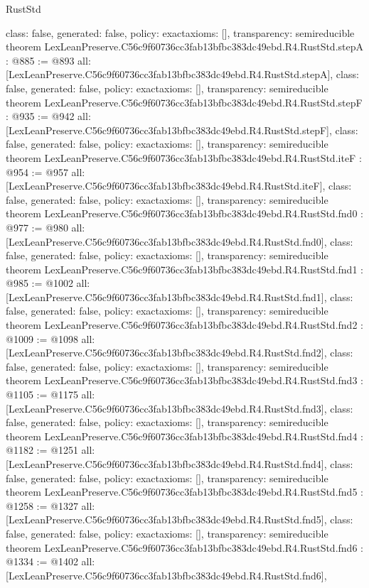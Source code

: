 \begin{lexlean}{RustStd}
\begin{coremodule}
{  class: false,
  generated: false,
  policy: exact{axioms: []},
  transparency: semireducible
}
theorem LexLeanPreserve.C56c9f60736cc3fab13bfbc383dc49ebd.R4.RustStd.stepA : @885 := @893 {
  all: [LexLeanPreserve.C56c9f60736cc3fab13bfbc383dc49ebd.R4.RustStd.stepA],
  class: false,
  generated: false,
  policy: exact{axioms: []},
  transparency: semireducible
}
theorem LexLeanPreserve.C56c9f60736cc3fab13bfbc383dc49ebd.R4.RustStd.stepF : @935 := @942 {
  all: [LexLeanPreserve.C56c9f60736cc3fab13bfbc383dc49ebd.R4.RustStd.stepF],
  class: false,
  generated: false,
  policy: exact{axioms: []},
  transparency: semireducible
}
theorem LexLeanPreserve.C56c9f60736cc3fab13bfbc383dc49ebd.R4.RustStd.iteF : @954 := @957 {
  all: [LexLeanPreserve.C56c9f60736cc3fab13bfbc383dc49ebd.R4.RustStd.iteF],
  class: false,
  generated: false,
  policy: exact{axioms: []},
  transparency: semireducible
}
theorem LexLeanPreserve.C56c9f60736cc3fab13bfbc383dc49ebd.R4.RustStd.fnd0 : @977 := @980 {
  all: [LexLeanPreserve.C56c9f60736cc3fab13bfbc383dc49ebd.R4.RustStd.fnd0],
  class: false,
  generated: false,
  policy: exact{axioms: []},
  transparency: semireducible
}
theorem LexLeanPreserve.C56c9f60736cc3fab13bfbc383dc49ebd.R4.RustStd.fnd1 : @985 := @1002 {
  all: [LexLeanPreserve.C56c9f60736cc3fab13bfbc383dc49ebd.R4.RustStd.fnd1],
  class: false,
  generated: false,
  policy: exact{axioms: []},
  transparency: semireducible
}
theorem LexLeanPreserve.C56c9f60736cc3fab13bfbc383dc49ebd.R4.RustStd.fnd2 : @1009 := @1098 {
  all: [LexLeanPreserve.C56c9f60736cc3fab13bfbc383dc49ebd.R4.RustStd.fnd2],
  class: false,
  generated: false,
  policy: exact{axioms: []},
  transparency: semireducible
}
theorem LexLeanPreserve.C56c9f60736cc3fab13bfbc383dc49ebd.R4.RustStd.fnd3 : @1105 := @1175 {
  all: [LexLeanPreserve.C56c9f60736cc3fab13bfbc383dc49ebd.R4.RustStd.fnd3],
  class: false,
  generated: false,
  policy: exact{axioms: []},
  transparency: semireducible
}
theorem LexLeanPreserve.C56c9f60736cc3fab13bfbc383dc49ebd.R4.RustStd.fnd4 : @1182 := @1251 {
  all: [LexLeanPreserve.C56c9f60736cc3fab13bfbc383dc49ebd.R4.RustStd.fnd4],
  class: false,
  generated: false,
  policy: exact{axioms: []},
  transparency: semireducible
}
theorem LexLeanPreserve.C56c9f60736cc3fab13bfbc383dc49ebd.R4.RustStd.fnd5 : @1258 := @1327 {
  all: [LexLeanPreserve.C56c9f60736cc3fab13bfbc383dc49ebd.R4.RustStd.fnd5],
  class: false,
  generated: false,
  policy: exact{axioms: []},
  transparency: semireducible
}
theorem LexLeanPreserve.C56c9f60736cc3fab13bfbc383dc49ebd.R4.RustStd.fnd6 : @1334 := @1402 {
  all: [LexLeanPreserve.C56c9f60736cc3fab13bfbc383dc49ebd.R4.RustStd.fnd6],
}
\end{coremodule}
\end{lexlean}
